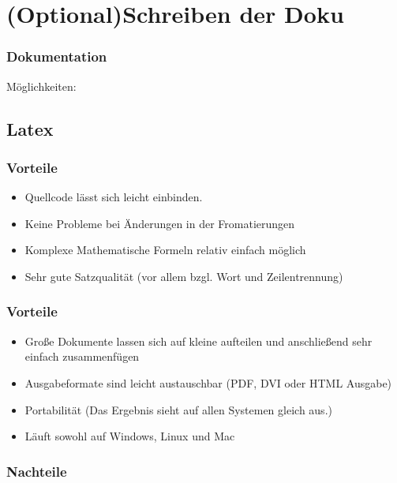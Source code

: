 \documentclass{beamer}
\begin{document}
\section{(Optional)Schreiben der Doku}
\begin{frame}[<+->]\frametitle{Dokumentation}
    Möglichkeiten:
\end{frame}
\subsection{Latex}
\begin{frame}[<+->]\frametitle{Vorteile}
    \pause
    \begin{itemize}
    	\item Quellcode lässt sich leicht einbinden.
    	\item Keine Probleme bei Änderungen in der Fromatierungen
    	\item Komplexe Mathematische Formeln relativ einfach möglich
    	\item Sehr gute Satzqualität (vor allem bzgl. Wort und Zeilentrennung)
    \end{itemize}
\end{frame}

\begin{frame}[<+->]\frametitle{Vorteile}
	\begin{itemize}
		\item Große Dokumente lassen sich auf kleine aufteilen und anschließend sehr einfach zusammenfügen
		\item Ausgabeformate sind leicht austauschbar (PDF, DVI oder HTML Ausgabe)
		\item Portabilität (Das Ergebnis sieht auf allen Systemen gleich aus.)
		\item Läuft sowohl auf Windows, Linux und Mac
	\end{itemize}
\end{frame}

\begin{frame}[<+->]\frametitle{Nachteile}
    \pause
\end{frame}
\end{document}
